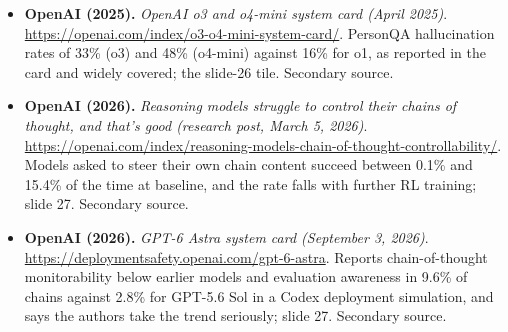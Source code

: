 \begin{itemize}[leftmargin=1.2em,itemsep=3pt]
\item \textbf{OpenAI (2025).} \textit{OpenAI o3 and o4-mini system card (April 2025)}. \url{https://openai.com/index/o3-o4-mini-system-card/}. PersonQA hallucination rates of 33\% (o3) and 48\% (o4-mini) against 16\% for o1, as reported in the card and widely covered; the slide-26 tile. Secondary source.
\item \textbf{OpenAI (2026).} \textit{Reasoning models struggle to control their chains of thought, and that's good (research post, March 5, 2026)}. \url{https://openai.com/index/reasoning-models-chain-of-thought-controllability/}. Models asked to steer their own chain content succeed between 0.1\% and 15.4\% of the time at baseline, and the rate falls with further RL training; slide 27. Secondary source.
\item \textbf{OpenAI (2026).} \textit{GPT-6 Astra system card (September 3, 2026)}. \url{https://deploymentsafety.openai.com/gpt-6-astra}. Reports chain-of-thought monitorability below earlier models and evaluation awareness in 9.6\% of chains against 2.8\% for GPT-5.6 Sol in a Codex deployment simulation, and says the authors take the trend seriously; slide 27. Secondary source.
\end{itemize}
